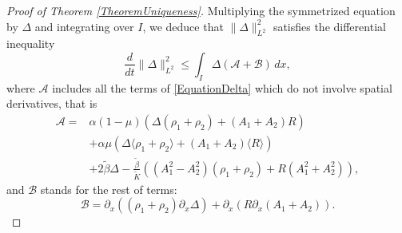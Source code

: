 \documentclass[12pt]{amsart}
\newcommand{\D}{\,d}
\begin{document}
\begin{proof}[Proof of Theorem \ref{TheoremUniqueness}]
	Multiplying the symmetrized equation by $\Delta$ and integrating over $I$, we deduce that $\|\Delta\|_{L^2}^2$ satisfies the differential inequality 
	\begin{equation*}
		\frac{d}{dt} \|\Delta\|_{L^2}^2\leq \int_I \Delta(\mathcal{A}+\mathcal{B}) \D x,
	\end{equation*}
	where $\mathcal{A}$ includes all the terms of \eqref{EquationDelta} which do not involve spatial derivatives, that is
	\begin{equation*}
		\begin{split}
			\mathcal{A}=&\alpha(1-\mu)(\Delta(\rho_1+\rho_2)+(A_1+A_2)R)\\
            &+\alpha\mu(\Delta\langle \rho_1+\rho_2 \rangle+ (A_1+A_2)\langle R \rangle)\\
			&+2\widetilde{\beta}\Delta-\frac{\widetilde{\beta}}{\widetilde{K}}((A_1^2 -A_2^2)(\rho_1+\rho_2)+R(A_1^2+A_2^2)),
		\end{split}
	\end{equation*}  
	and $\mathcal{B}$ stands for the rest of terms:
	\begin{equation*}
		\mathcal{B}=\partial_x((\rho_1+\rho_2)\partial_x \Delta)+\partial_x(R\partial_x (A_1+A_2)).
	\end{equation*}
	

\end{proof}
\end{document}
